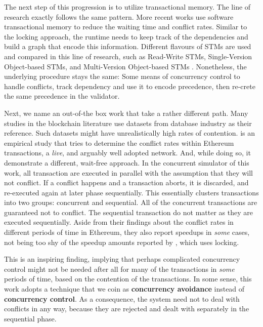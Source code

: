The next step of this progression is to utilize transactional memory. The line of research exactly
follows the same pattern. More recent works use software transactional memory to reduce the waiting
time and conflict rates. Similar to the locking approach, the runtime needs to keep track of the
dependencies and build a graph that encode this information. Different flavours of STMs are used and
compared in this line of research, such as Read-Write STMs, Single-Version Object-based STMs, and
Multi-Version Object-based STMs
\cite{anjanaSTMEfficientConcurrent2019,anjanaSTMEfficientFramework2019}. Nonetheless, the underlying
procedure stays the same: Some means of concurrency control to handle conflicts, track dependency
and use it to encode precedence, then re-crete the same precedence in the validator.

Next, we name an out-of-the box work that take a rather different path. Many studies in the
blockchain literature use datasets from database industry as their reference. Such datasets might
have unrealistically high rates of contention. \cite{saraphYOLOEmpiricalStudy2019} is an empirical
study that tries to determine the conflict rates within Ethereum transactions, a \textit{live}, and
arguably well adopted network. And, while doing so, it demonstrate a different, wait-free approach.
In the concurrent simulator of this work, all transaction are executed in parallel with the
assumption that they will not conflict. If a conflict happens and a transaction aborts, it is
discarded, and re-executed again at later phase sequentially. This essentially clusters transactions
into two groups: concurrent and sequential. All of the concurrent transactions are guaranteed not to
conflict. The sequential transaction do not matter as they are executed sequentially. Aside from
their findings about the conflict rates in different periods of time in Ethereum, they also report
speedups in \textit{some} cases, not being too shy of the speedup amounts reported by
\cite{dickersonSmartLocksAddingConcurrency2017}, which uses locking.

This is an inspiring finding, implying that perhaps complicated concurrency control might not be
needed after all for many of the transactions in \textit{some} periods of time, based on the
contention of the transactions. In some sense, this work adopts a technique that we coin as
\textbf{concurrency avoidance} instead of \textbf{concurrency control}. As a consequence, the system
need not to deal with conflicts in any way, because they are rejected and dealt with separately in
the sequential phase.

